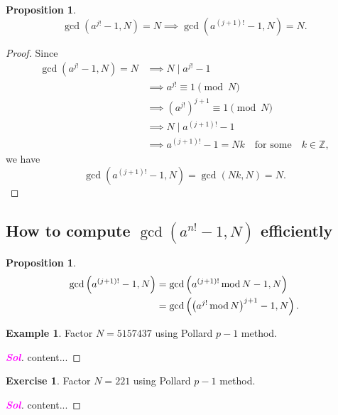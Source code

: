 \documentclass[12pt,openany]{book}
\newtheorem{proposition}[theorem]{Proposition}
\theoremstyle{definition}
\newtheorem{exercise}{Exercise}[chapter]
\newtheorem{example}{Example}[chapter]
\newcommand{\Z}{\mathbb{Z}}
\newcommand{\of}[1]{\left( #1 \right)}
\newcommand{\sol}{\textcolor{magenta}{\bf Sol}}
\renewcommand{\mod}{\operatorname{\textnormal{mod}}}
\begin{document}
	\begin{tcolorbox}[colback=white,colframe=procolor,arc=5pt,title={\color{white}\bf Existence of the Multiple of $p-1$}]
		\begin{proposition}
			\[
			\gcd\of{a^{j!}-1,N}=N\implies\gcd\of{a^{\of{j+1}!}-1,N}=N.
			\]
		\end{proposition}
	\end{tcolorbox}
	\begin{proof}
		Since \begin{align*}
		\gcd\of{a^{j!}-1,N}=N&\implies N\mid a^{j!}-1\\
		&\implies a^{j!}\equiv 1\pmod{N}\\
		&\implies \of{a^{j!}}^{j+1}\equiv 1\pmod{N}\\
		&\implies N\mid a^{\of{j+1}!}-1\\
		&\implies a^{\of{j+1}!}-1=Nk\quad \text{for some}\quad k\in\Z,
		\end{align*} we have \[
		\gcd\of{a^{\of{j+1}!}-1,N}=\gcd\of{Nk,N}=N.
		\]
	\end{proof}
	
	\subsection{How to compute $\gcd\of{a^{n!}-1,N}$ efficiently}
	
	\begin{tcolorbox}[colback=white,colframe=procolor,arc=5pt,title={\color{white}\bf Existence of the Multiple of $p-1$}]
		\begin{proposition}
			\begin{align*}
				\gcd\of{a^{\of{j+1}!}-1,N}&=\gcd\of{a^{\of{j+1}!}\mod N-1,N}\\
				&=\gcd\of{\of{a^{j!}\mod N}^{j+1}-1,N}.
			\end{align*}
		\end{proposition}
	\end{tcolorbox}
	
	\begin{example}
		Factor $N=5157437$ using Pollard $p-1$ method.\begin{proof}[\sol]
			content...
		\end{proof}
	\end{example}
	
	
	\begin{exercise}
		Factor $N=221$ using Pollard $p-1$ method.\begin{proof}[\sol]
			content...
		\end{proof}
	\end{exercise}
\end{document}
